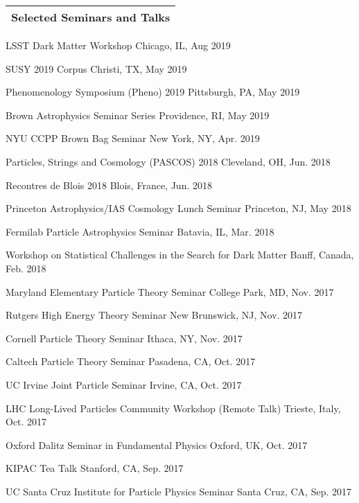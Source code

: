 \documentclass[11pt]{article}
\newenvironment{packed_itemize}{
\begin{itemize}
  \setlength{\itemsep}{3pt}
  \setlength{\parskip}{0pt}
  \setlength{\parsep}{0pt}}{\end{itemize}
}
\begin{document}

\vspace{2.0mm}

\noindent
\begin{tabular*}{\textwidth}{l@{\extracolsep{\fill}}}
\large {\sc \Large{Selected Seminars and Talks}}\\
\hline
\end{tabular*}\vspace{1.5mm}
\begin{packed_itemize}
\item LSST Dark Matter Workshop \hfill Chicago, IL, Aug 2019
\item SUSY 2019 \hfill Corpus Christi, TX, May 2019
\item Phenomenology Symposium (Pheno) 2019 \hfill Pittsburgh, PA, May 2019
\item Brown Astrophysics Seminar Series \hfill Providence, RI, May 2019
\item NYU CCPP Brown Bag Seminar \hfill New York, NY, Apr. 2019
\item Particles, Strings and Cosmology (PASCOS) 2018 \hfill Cleveland, OH, Jun. 2018
\item Recontres de Blois 2018 \hfill Blois, France, Jun. 2018
\item Princeton Astrophysics/IAS Cosmology Lunch Seminar \hfill Princeton, NJ, May 2018
\item Fermilab Particle Astrophysics Seminar \hfill Batavia, IL, Mar. 2018
\item Workshop on Statistical Challenges in the Search for Dark Matter \hfill Banff, Canada, Feb. 2018
\item Maryland Elementary Particle Theory Seminar \hfill College Park, MD, Nov. 2017
\item Rutgers High Energy Theory Seminar \hfill New Brunswick, NJ, Nov. 2017
\item Cornell Particle Theory Seminar \hfill Ithaca, NY, Nov. 2017
\item Caltech Particle Theory Seminar \hfill Pasadena, CA, Oct. 2017
\item UC Irvine Joint Particle Seminar \hfill Irvine, CA, Oct. 2017
\item LHC Long-Lived Particles Community Workshop (Remote Talk) \hfill Trieste, Italy, Oct. 2017
\item Oxford Dalitz Seminar in Fundamental Physics  \hfill Oxford, UK, Oct. 2017
\item KIPAC Tea Talk  \hfill Stanford, CA, Sep. 2017
\item UC Santa Cruz Institute for Particle Physics Seminar  \hfill Santa Cruz, CA, Sep. 2017

\end{packed_itemize}
\end{document}
